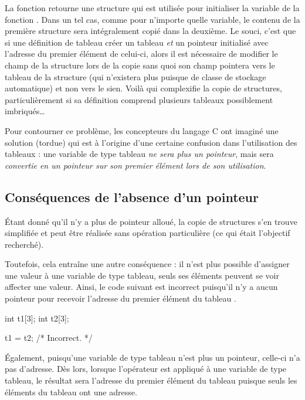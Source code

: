 La fonction  retourne une structure qui est
utilisée pour initialiser la variable de la fonction .
Dans un tel cas, comme pour n'importe quelle variable, le contenu de la
première structure sera intégralement copié dans la deuxième. Le souci,
c'est que si une définition de tableau créer un tableau \emph{et} un
pointeur initialisé avec l'adresse du premier élément de celui-ci, alors
il est nécessaire de modifier le champ  de la structure
 lors de la copie sans quoi son champ  pointera
vers le tableau de la structure  (qui n'existera plus
puisque de classe de stockage automatique) et non vers le sien. Voilà
qui complexifie la copie de structures, particulièrement si sa
définition comprend plusieurs tableaux possiblement imbriqués\ldots{}

Pour contourner ce problème, les concepteurs du langage C ont imaginé
une solution (tordue) qui est à l'origine d'une certaine confusion dans
l'utilisation des tableaux : une variable de type tableau \emph{ne sera
plus un pointeur}, mais sera \emph{convertie en un pointeur sur son
premier élément lors de son utilisation}.

\subsection{Conséquences de l'absence d'un pointeur}
\label{consequences-de-labsence-dun-pointeur}

Étant donné qu'il n'y a plus de pointeur alloué, la copie de structures
s'en trouve simplifiée et peut être réalisée sans opération particulière
(ce qui était l'objectif recherché).

Toutefois, cela entraîne une autre conséquence : il n'est plus possible
d'assigner une valeur à une variable de type tableau, seuls ses éléments
peuvent se voir affecter une valeur. Ainsi, le code suivant est
incorrect puisqu'il n'y a aucun pointeur pour recevoir l'adresse du
premier élément du tableau .

\begin{C}
int t1[3];
int t2[3];

t1 = t2; /* Incorrect. */
\end{C}

Également, puisqu'une variable de type tableau n'est plus un pointeur,
celle-ci n'a pas d'adresse. Dès lors, lorsque l'opérateur \mybox{\&}
est appliqué à une variable de type tableau, le résultat sera l'adresse
du premier élément du tableau puisque seuls les éléments du tableau ont
une adresse.

